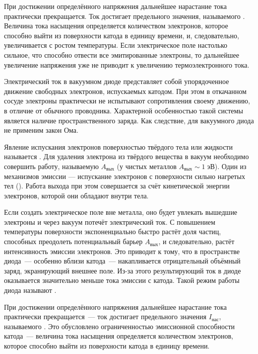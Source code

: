 При достижении определённого напряжения дальнейшее
нарастание тока практически прекращается. Ток достигает предельного значения,
называемого . Величина тока насыщения определяется количеством
электронов, которое способно выйти из поверхности катода в единицу времени, и,
следовательно, увеличивается с ростом температуры. Если электрическое поле настолько
сильное, что способно отвести все эмитированные электроны, то дальнейшее
увеличение напряжения уже не приводит к увеличению термоэлектронного тока.
\todo[inline]{<--}

Электрический ток в вакуумном диоде представляет собой упорядоченное движение
свободных электронов, испускаемых катодом.  При этом в откачанном сосуде
электроны практически не испытывают сопротивления своему движению,
в отличие от обычного проводника. Характерной особенностью такой системы
является наличие пространственного заряда. Как следствие, для вакуумного
диода не применим закон Ома.

Явление испускания электронов поверхностью твёрдого тела или жидкости называется
. Для удаления электрона из твёрдого вещества в
вакуум необходимо совершить работу, называемую  $A_{вых}$
(у чистых металлов $A_{вых}\sim 1\;эВ$).
Один из механизмов эмиссии --- испускание электронов с поверхности сильно
нагретых тел ().
Работа выхода при этом совершается за счёт кинетической энергии электронов,
которой они обладают внутри тела.

Если создать электрическое поле вне металла, оно будет увлекать вышедшие
электроны и через вакуум потечёт электрический ток.
С повышением температуры поверхности экспоненциально быстро растёт доля частиц,
способных преодолеть потенциальный барьер $A_{вых}$,
и следовательно, растёт интенсивность эмиссии электронов. Это приводит к тому, что
в пространстве диода~--- особенно вблизи катода~--- накапливается отрицательный
объёмный заряд, экранирующий внешнее поле. Из-за этого результирующий ток
в диоде оказывается значительно меньше тока эмиссии с катода.
Такой режим работы диода называют .

При достижении определённого напряжения дальнейшее нарастание тока практически
прекращается~--- ток достигает предельного значения $I_{нас}$, называемого
. Это обусловлено ограниченностью эмиссионной способности
катода~--- величина тока насыщения определяется количеством электронов,
которое способно выйти из поверхности катода в единицу времени.
\todo[inline,color=green]{<---}


